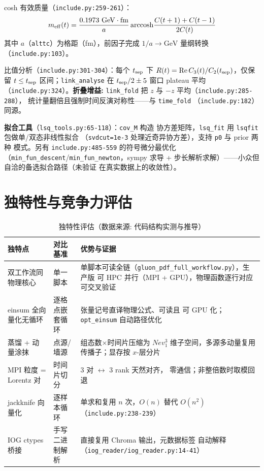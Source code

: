 \documentclass[UTF8]{ctexart}
\begin{document}
cosh 有效质量（\texttt{\nolinkurl{include.py:259-261}}）：
\begin{equation}\label{eq:meff}
m_{\rm eff}(t) = \frac{0.1973\ \mathrm{GeV\cdot fm}}{a}
\operatorname{arccosh}\!\frac{C(t+1)+C(t-1)}{2C(t)}
\end{equation}
其中 $a$（\texttt{alttc}）为格距（fm），前因子完成 $1/a\to\mathrm{GeV}$
量纲转换（\texttt{\nolinkurl{include.py:103}}）。

比值分析（\texttt{\nolinkurl{include.py:301-304}}）：每个 $t_{\rm sep}$ 下
$R(t)=\mathrm{Re}\,C_3(t)/C_2(t_{\rm sep})$，仅保留
$t\le t_{\rm sep}$ 区间；\texttt{link\_analyse} 在 $t_{\rm sep}/2\pm5$ 窗口
plateau 平均（\texttt{\nolinkurl{include.py:324}}）。\textbf{折叠增益:}
\texttt{link\_fold} 把 $z$ 与 $-z$ 平均（\texttt{\nolinkurl{include.py:285-288}}），
统计量翻倍且强制时间反演对称性——与 \texttt{time\_fold}
（\texttt{\nolinkurl{include.py:182}}）同源。

\textbf{拟合工具}（\texttt{\nolinkurl{lsq\_tools.py:65-118}}）：\texttt{cov\_M} 构造
协方差矩阵，\texttt{lsq\_fit} 用 \texttt{lsqfit} 包做单/双态非线性拟合
（\texttt{svdcut=1e-3} 处理近奇异协方差），支持 \texttt{p0} 与 prior 两种
模式。另有 \texttt{\nolinkurl{include.py:485-559}} 的符号微分最优化
（\texttt{min\_fun\_descent}/\texttt{min\_fun\_newton}，sympy 求导 +
步长解析求解）——小众但自洽的备选拟合路径（\textcolor{warn}{未验证}
在真实数据上的收敛性）。

\section{独特性与竞争力评估}

\begin{table}[htbp]\centering
\begin{tabularx}{\textwidth}{lXX}
\toprule
\textcolor{algo}{独特点} & 对比基准 & 优势与证据 \\
\midrule
双工作流同物理核心 & 单一脚本 & 单脚本可读全链（\texttt{gluon\_pdf\_full\_workflow.py}），生产版
可 HPC 并行（MPI + GPU），物理函数逐行对应可交叉验证 \\
einsum 全向量化无循环 & 逐格点嵌套循环 & 张量记号直译物理公式、可读且
可 GPU 化；\texttt{opt\_einsum} 自动路径优化 \\
蒸馏 + 动量涂抹 & 点源/墙源 & 组态数$\times$时间片压缩为
$Nev_1^3$ 维子空间，多源多动量复用传播子；显存按 $x$-层分片 \\
MPI 粒度 = Lorentz 对 & 时间片切分 & 3 对 $\leftrightarrow$ 3 rank 天然对齐，
零通信；非整倍数时取模回退 \\
jackknife 向量化 & 逐样本循环 & 单求和复用 $n$ 次，$O(n)$ 替代 $O(n^2)$
（\texttt{\nolinkurl{include.py:238-239}}） \\
IOG ctypes 桥接 & 手写二进制解析 & 直接复用 Chroma 输出，元数据标签
自动解释（\texttt{\nolinkurl{iog\_reader/iog\_reader.py:14-41}}） \\
\bottomrule
\end{tabularx}
\caption{独特性评估（数据来源: 代码结构实测与推导）}
\end{table}
\end{document}
